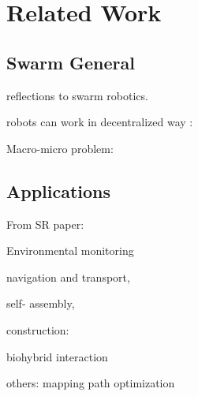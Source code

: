 \chapter{Related Work}
\label{ch2}


\section{Swarm General}

\cite{dorigo2020reflections} reflections to swarm robotics.

robots can work in decentralized way :
\cite{dorigo2004evolving}
\cite{nouyan2009teamwork}
\cite{dorigo2013swarmanoid}
\cite{rubenstein2014programmable}
\cite{li2019decentralized}


Macro-micro problem:

\cite{hamann2008framework}

\cite{hamann2010space}

\cite{hamann2018swarm}

\section{Applications}

From SR paper: 

\cite{talamali2021less} Environmental monitoring 

\cite{dorigo2013swarmanoid} navigation and transport,

\cite{rubenstein2014programmable} self- assembly,

construction:

\cite{team2012designing}
\cite{petersen2019review}

biohybrid interaction 
\cite{wahby2018autonomously}
\cite{halloy2007social}

others:
\cite{howard2006multi} mapping
\cite{psaraftis2016dynamic} path optimization

